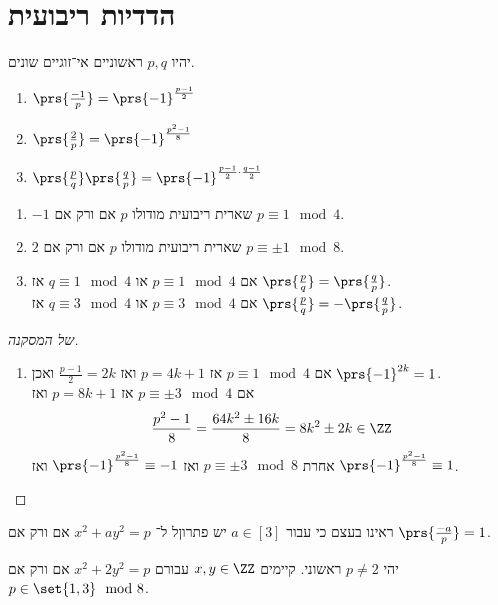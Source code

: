 \documentclass[a4paper,10pt,twoside,openany]{book}
\begin{document}
\chapter{הדדיות ריבועית}
\begin{theorem}
יהיו
$p,q$
ראשוניים אי־זוגיים שונים.
\begin{enumerate}
\item $\prs{\frac{-1}{p}} = \prs{-1}^{\frac{p-1}{2}}$
\item $\prs{\frac{2}{p}} = \prs{-1}^{\frac{p^2 - 1}{8}}$
\item $\prs{\frac{p}{q}} \prs{\frac{q}{p}} = \prs{-1}^{{\frac{p-1}{2}}\cdot {\frac{q-1}{2}}}$
\end{enumerate}
\end{theorem}
\begin{corollary}
\begin{enumerate}
\item $-1$
שארית ריבועית מודולו
$p$
אם ורק אם
$p \equiv 1 \mod{4}$.
\item $2$
שארית ריבועית מודולו
$p$
אם ורק אם
$p \equiv \pm 1 \mod{8}$.
\item אם
$p \equiv 1 \mod{4}$
או
$q \equiv 1 \mod{4}$
אז
$\prs{\frac{p}{q}} = \prs{\frac{q}{p}}$.\\
אם
$p \equiv 3 \mod{4}$
או
$q \equiv 3 \mod{4}$
אז
$\prs{\frac{p}{q}} = -\prs{\frac{q}{p}}$.
\end{enumerate}
\end{corollary}
\begin{proof}[של המסקנה]
\begin{enumerate}
\item אם
$p \equiv 1 \mod{4}$
אז
$p = 4k + 1$
ואז
$\frac{p-1}{2} = 2k$
ואכן
$\prs{-1}^{2k} = 1$.\\
אם
$p \equiv \pm 3 \mod{4}$
אז
$p = 8k + 1$
ואז
\[\frac{p^2 - 1}{8} = \frac{64 k^2 \pm 16k}{8} = 8k^2 \pm 2k \in \ZZ\]
אחרת
$p \equiv \pm 3 \mod{8}$
ואז
$\prs{-1}^{\frac{p^2 - 1}{8}} \equiv - 1$
ואז
$\prs{-1}^{\frac{p^2 - 1}{8}} \equiv 1$.
\end{enumerate}
\end{proof}

ראינו בעצם כי עבור
$a \in [3]$
יש פתרוןל ל־%
$x^2 + ay^2 = p$
אם ורק אם
$\prs{\frac{-a}{p}} = 1$.

\begin{theorem}[אוילר]
יהי
$p \neq 2$
ראשוני. קיימים
$x,y \in \ZZ$
עבורם
$x^2 + 2y^2 = p$
אם ורק אם
$p \in \set{1,3} \mod{8}$.
\end{theorem}
\end{document}
